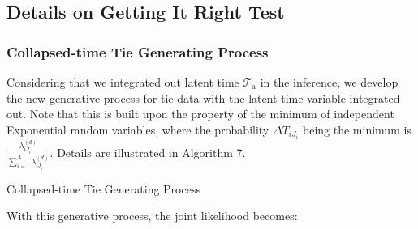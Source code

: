 \documentclass[a4paper]{article}
\begin{document}
   \subsection{Details on Getting It Right Test}\label{subsec:Details on GiR}
        \subsubsection{Collapsed-time Tie Generating Process} \label{subsubsec: collapsed time Generative Process}
        Considering that we integrated out latent time $\mathcal{T}_{\mbox{a}}$ in the inference, we develop the new generative process for tie data with the latent time variable integrated out. Note that this is built upon the property of the minimum of independent Exponential random variables, where the probability $\Delta T_{i{J_i}}$ being the minimum is $\frac{\lambda_{i{J_i}}^{(d)}}{\sum_{i=1}^A\lambda_{i{J_i}}^{(d)}}$. Details are illustrated in Algorithm 7.
        \begin{algorithm}[H]
        	\SetAlgoLined
        	\caption{Collapsed-time Tie Generating Process}
        \end{algorithm}
        \noindent With this generative process, the joint likelihood becomes:
\end{document}
